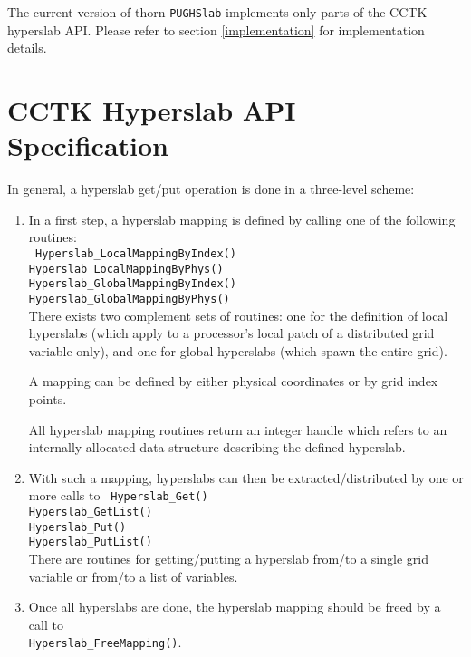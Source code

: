 \documentclass{article}
\begin{document}
The current version of thorn {\tt PUGHSlab} implements only parts of the CCTK
hyperslab API.
Please refer to section \ref{implementation} for implementation details.


\section{CCTK Hyperslab API Specification}
\label{specification}

In general, a hyperslab get/put operation is done in a three-level scheme:

\begin{enumerate}
  \item In a first step, a hyperslab mapping is defined by calling one of the
    following routines:\\
    {\tt
      \hspace*{3ex}Hyperslab\_LocalMappingByIndex()\\
      \hspace*{3ex}Hyperslab\_LocalMappingByPhys()\\
      \hspace*{3ex}Hyperslab\_GlobalMappingByIndex()\\
      \hspace*{3ex}Hyperslab\_GlobalMappingByPhys()\\
    }
    There exists two complement sets of routines: one for the definition of
    local hyperslabs (which apply to a processor's local patch of a distributed
    grid variable only), and one for global hyperslabs (which spawn the entire
    grid).

    A mapping can be defined by either physical coordinates or by grid index points.

    All hyperslab mapping routines return an integer handle which refers to an
    internally allocated data structure describing the defined hyperslab.

  \item With such a mapping, hyperslabs can then be extracted/distributed by
    one or more calls to
    {\tt
      \hspace*{3ex}Hyperslab\_Get()\\
      \hspace*{3ex}Hyperslab\_GetList()\\
      \hspace*{3ex}Hyperslab\_Put()\\
      \hspace*{3ex}Hyperslab\_PutList()\\
    }
    There are routines for getting/putting a hyperslab from/to a single grid
    variable or from/to a list of variables.

  \item Once all hyperslabs are done, the hyperslab mapping should be freed by
    a call to\\
    {\tt\hspace*{3ex}Hyperslab\_FreeMapping()}.
\end{enumerate}
\end{document}
